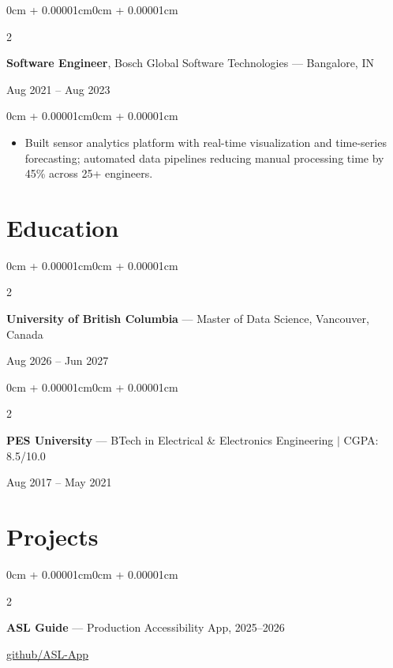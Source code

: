 \documentclass[10pt, letterpaper]{article}
\newenvironment{highlights}{
    \begin{itemize}[
        topsep=0.08cm, parsep=0.08cm,
        partopsep=0pt, itemsep=0pt,
        leftmargin=0cm + 10pt
    ]
}{\end{itemize}}
\newenvironment{onecolentry}{
    \begin{adjustwidth}{0cm + 0.00001cm}{0cm + 0.00001cm}
}{\end{adjustwidth}}
\newenvironment{twocolentry}[2][]{
    \onecolentry
    \def\secondColumn{#2}
    \setcolumnwidth{\fill, 4.5cm}
    \begin{paracol}{2}
}{
    \switchcolumn \raggedleft \secondColumn
    \end{paracol}
    \endonecolentry
}
\begin{document}
\vspace{0.15cm}

\begin{twocolentry}{Aug 2021 -- Aug 2023}
    \textbf{Software Engineer}, Bosch Global Software Technologies --- Bangalore, IN
\end{twocolentry}

\vspace{0.08cm}
\begin{onecolentry}
    \begin{highlights}
        \item Built sensor analytics platform with real-time visualization and time-series forecasting; automated data pipelines reducing manual processing time by 45\% across 25+ engineers.
    \end{highlights}
\end{onecolentry}

\vspace{0.1cm}

\section{Education}

\begin{twocolentry}{Aug 2026 -- Jun 2027}
    \textbf{University of British Columbia} --- Master of Data Science, Vancouver, Canada
\end{twocolentry}

\vspace{0.12cm}

\begin{twocolentry}{Aug 2017 -- May 2021}
    \textbf{PES University} --- BTech in Electrical \& Electronics Engineering $|$ CGPA: 8.5/10.0
\end{twocolentry}

\vspace{0.1cm}

\section{Projects}

\begin{twocolentry}{\href{https://github.com/shravnchandr/ASL-App}{\underline{github/ASL-App}}}
    \textbf{ASL Guide} --- Production Accessibility App, 2025--2026
\end{twocolentry}
\end{document}
